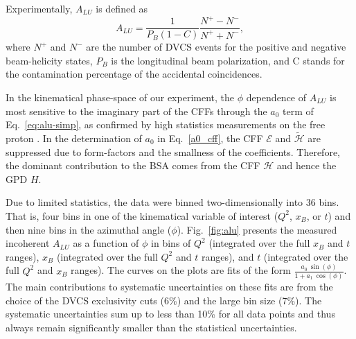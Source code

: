 \documentclass[twocolumn,nofootinbib,prl,superscriptaddress,secnumarabic,amssymb,nobibnotes,aps,floatfix]{revtex4}
\begin{document}

Experimentally, $A_{LU}$ is defined as
\begin{equation}
   A_{LU} = \frac{1}{P_{B}(1-C)} \frac{N^{+} - N^{-}}{N^{+} + N^{-} },
\end{equation}
where $N^{+}$ and $N^{-}$ are the number of DVCS events for the positive and 
negative beam-helicity states, $P_{B}$ is the longitudinal beam polarization, 
and C stands for the contamination percentage of the accidental coincidences.  

In the kinematical phase-space of our experiment, the $\phi$ dependence of 
$A_{LU}$ is most sensitive to the imaginary part of the CFFs through the $a_0$ 
term of Eq.~\ref{eq:alu-simp}, as confirmed by high statistics measurements on 
the free proton \cite{Girod:2007aa,Jo:2015ema}. In the determination of $a_0$ 
in Eq.~\ref{a0_cff}, the CFF $\mathcal{E}$ and $\mathcal{\tilde {H}}$ are 
suppressed due to form-factors and the smallness of the coefficients.  
Therefore, the dominant contribution to the BSA comes from the CFF 
$\mathcal{H}$ and hence the GPD $H$.


Due to limited statistics, the data were binned two-dimensionally into 36 bins.  
That is, four bins in one of the kinematical variable of interest ($Q^{2}$, 
$x_{B}$, or $t$) and then nine bins in the azimuthal angle ($\phi$).   
Fig.~\ref{fig:alu} presents the measured incoherent $A_{LU}$ as a function of 
$\phi$ in bins of $Q^{2}$ (integrated over the full $x_{B}$ and $t$ ranges), 
$x_{B}$ (integrated over the full $Q^{2}$ and $t$ ranges), and $t$ (integrated 
over the full $Q^{2}$ and $x_{B}$ ranges). The curves on the plots are fits of 
the form $\frac{a_{0}~\sin(\phi)}{1+ a_{1}~\cos(\phi)}$.  The main 
contributions to systematic uncertainties on these fits are from the choice of 
the DVCS exclusivity cuts (6\%) and the large bin size (7\%). The systematic 
uncertainties sum up to less than 10\% for all data points and thus always 
remain significantly smaller than the statistical uncertainties.
\end{document}
